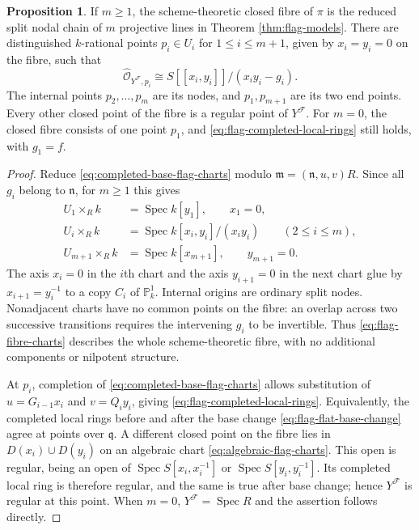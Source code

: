 \documentclass[a4paper,reqno]{amsart}
\def\F{\mathcal{F}}
\def\O{\mathcal{O}}
\def\m{\mathfrak{m}}
\def\n{\mathfrak{n}}
\DeclareMathOperator{\Spec}{Spec}
\theoremstyle{definition}
\newtheorem{Prop}[Thm]{Proposition}
\begin{document}
\begin{Prop}\label{prop:flag-fibre}
If $m\ge1$, the scheme-theoretic closed fibre of $\pi$ is the reduced split nodal chain of $m$ projective lines in Theorem \ref{thm:flag-models}. There are distinguished $k$-rational points $p_i\in U_i$ for $1\le i\le m+1$, given by $x_i=y_i=0$ on the fibre, such that
\begin{equation}\label{eq:flag-completed-local-rings}
\widehat{\O}_{Y^\F,p_i}\cong S[[x_i,y_i]]/(x_iy_i-g_i).
\end{equation}
The internal points $p_2,\ldots,p_m$ are its nodes, and $p_1,p_{m+1}$ are its two end points. Every other closed point of the fibre is a regular point of $Y^\F$. For $m=0$, the closed fibre consists of one point $p_1$, and \eqref{eq:flag-completed-local-rings} still holds, with $g_1=f$.
\end{Prop}
\begin{proof}
Reduce \eqref{eq:completed-base-flag-charts} modulo $\m=(\n,u,v)R$. Since all $g_i$ belong to $\n$, for $m\ge1$ this gives
\begin{equation}\label{eq:flag-fibre-charts}
\begin{split}
U_1\times_R k&=\Spec k[y_1],\qquad x_1=0,\\
U_i\times_R k&=\Spec k[x_i,y_i]/(x_iy_i)
\qquad(2\le i\le m),\\
U_{m+1}\times_R k&=\Spec k[x_{m+1}],\qquad y_{m+1}=0.
\end{split}
\end{equation}
The axis $x_i=0$ in the $i$th chart and the axis $y_{i+1}=0$ in the next chart glue by $x_{i+1}=y_i^{-1}$ to a copy $C_i$ of $\mathbb P^1_k$. Internal origins are ordinary split nodes. Nonadjacent charts have no common points on the fibre: an overlap across two successive transitions requires the intervening $g_i$ to be invertible. Thus \eqref{eq:flag-fibre-charts} describes the whole scheme-theoretic fibre, with no additional components or nilpotent structure.

At $p_i$, completion of \eqref{eq:completed-base-flag-charts} allows substitution of $u=G_{i-1}x_i$ and $v=Q_iy_i$, giving \eqref{eq:flag-completed-local-rings}. Equivalently, the completed local rings before and after the base change \eqref{eq:flag-flat-base-change} agree at points over $\mathfrak q$. A different closed point on the fibre lies in $D(x_i)\cup D(y_i)$ on an algebraic chart \eqref{eq:algebraic-flag-charts}. This open is regular, being an open of $\Spec S[x_i,x_i^{-1}]$ or $\Spec S[y_i,y_i^{-1}]$. Its completed local ring is therefore regular, and the same is true after base change; hence $Y^\F$ is regular at this point. When $m=0$, $Y^\F=\Spec R$ and the assertion follows directly.
\end{proof}
\end{document}
